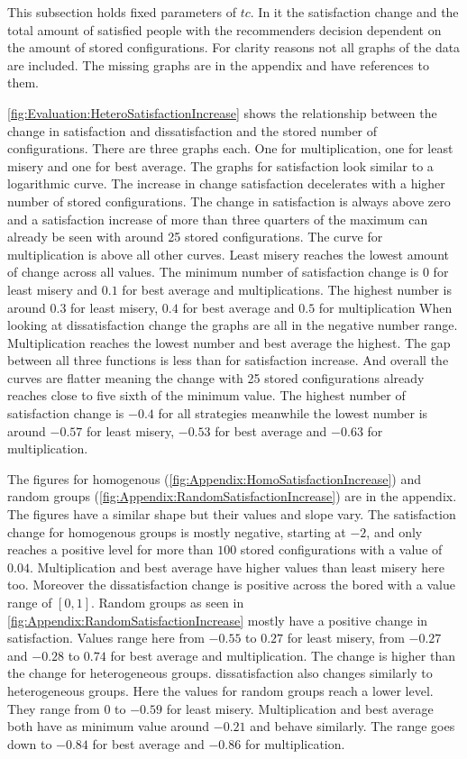 This subsection holds fixed parameters of $tc$. In it the satisfaction change and the total amount of satisfied people with the recommenders decision dependent on the amount of stored configurations. For clarity reasons not all graphs of the data are included. The missing graphs are in the appendix and have references to them.

\autoref{fig:Evaluation:HeteroSatisfactionIncrease} shows the relationship between the change in satisfaction and dissatisfaction and the stored number of configurations. There are three graphs each. One for multiplication, one for least misery and one for best average. The graphs for satisfaction look similar to a logarithmic curve. The increase in change satisfaction decelerates with a higher number of stored configurations. The change in satisfaction is always above zero and a satisfaction increase of more than three quarters of the maximum can already be seen with around 25 stored configurations. The curve for multiplication is above all other curves. Least misery reaches the lowest amount of change across all values. The minimum number of satisfaction change is $0$ for least misery and $0.1$ for best average and multiplications. The highest number is around $0.3$ for least misery, $0.4$ for best average and $0.5$ for multiplication
When looking at dissatisfaction change the graphs are all in the negative number range. Multiplication reaches the lowest number and best average the highest. The gap between all three functions is less than for satisfaction increase. And overall the curves are flatter meaning the change with 25 stored configurations already reaches close to five sixth of the minimum value. The highest number of satisfaction change is $-0.4$ for all strategies meanwhile the lowest number is around $-0.57$ for least misery, $-0.53$ for best average and $-0.63$ for multiplication.

The figures for homogenous (\autoref{fig:Appendix:HomoSatisfactionIncrease}) and random groups (\autoref{fig:Appendix:RandomSatisfactionIncrease}) are in the appendix. The figures have a similar shape but their values and slope vary. The satisfaction change for homogenous groups is mostly negative, starting at $-2$, and only reaches a positive level for more than $100$ stored configurations with a value of $0.04$. Multiplication and best average have higher values than least misery here too. Moreover the dissatisfaction change is positive across the bored with a value range of $[0,1]$.
Random groups as seen in \autoref{fig:Appendix:RandomSatisfactionIncrease} mostly have a positive change in satisfaction. Values range here from $-0.55$ to $0.27$ for least misery, from $-0.27$ and $-0.28$ to $0.74$ for best average and multiplication. The change is higher than the change for heterogeneous groups. dissatisfaction also changes similarly to heterogeneous groups. Here the values for random groups reach a lower level. They range from $0$ to $-0.59$ for least misery. Multiplication and best average both have as minimum value around $-0.21$ and behave similarly. The range goes down to $-0.84$ for best average and $-0.86$ for multiplication.

